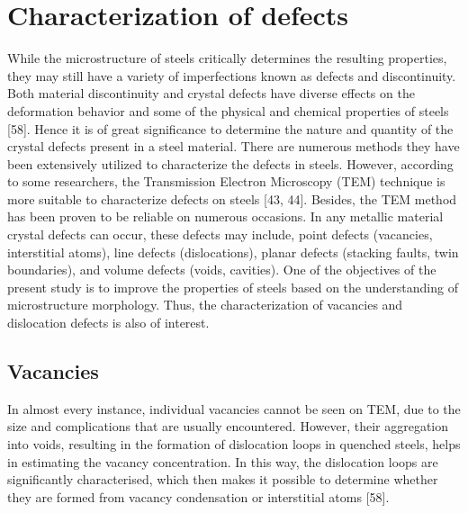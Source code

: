 \documentclass[12pt]{report}
\begin{document}
\section{Characterization of defects} 
While the microstructure of steels critically determines the resulting properties, they may still have a variety of imperfections known as defects and discontinuity. Both material discontinuity and crystal defects have diverse effects on the deformation behavior and some of the physical and chemical properties of steels [58]. Hence it is of great significance to determine the nature and quantity of the crystal defects present in a steel material. 
There are numerous methods they have been extensively utilized to characterize the defects in steels. However, according to some researchers, the Transmission Electron Microscopy (TEM) technique is more suitable to characterize defects on steels [43, 44]. Besides, the TEM method has been proven to be reliable on numerous occasions. In any metallic material crystal defects can occur, these defects may include, point defects (vacancies, interstitial atoms), line defects (dislocations), planar defects (stacking faults, twin boundaries), and volume defects (voids, cavities). One of the objectives of the present study is to improve the properties of steels based on the understanding of microstructure morphology. Thus, the characterization of vacancies and dislocation defects is also of interest.

\subsection{Vacancies} 
 In almost every instance, individual vacancies cannot be seen on TEM, due to the size and complications that are usually encountered. However, their aggregation into voids, resulting in the formation of dislocation loops in quenched steels, helps in estimating the vacancy concentration. In this way, the dislocation loops are significantly characterised, which then makes it possible to determine whether they are formed from vacancy condensation or interstitial atoms [58].
\end{document}
